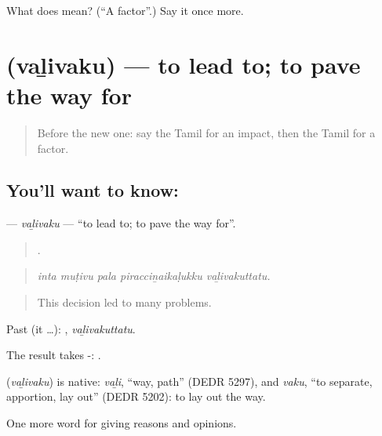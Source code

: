 \begin{tcolorbox}[breakable,colback=teal!4,colframe=teal!35!black,title={Before you move on}]
What does  mean? (\textquotedblleft{}A factor\textquotedblright{}.) Say it once more.
\end{tcolorbox}
\section[\texorpdfstring{\ta{வழிவகு} (vaḻivaku)}{வழிவகு (vaḻivaku)}]{ (vaḻivaku) — to lead to; to pave the way for}

\label{lesson:TA-C352-valivaku}



\begin{quote}
Before the new one: say the Tamil for an impact, then the Tamil for a factor.
\end{quote}

\subsection*{You'll want to know: }
\textbf{} — \emph{vaḻivaku} — \textquotedblleft{}to lead to; to pave the way for\textquotedblright{}.

\begin{quote}
    .
\end{quote}

\begin{quote}
\emph{inta muṭivu pala piracciṉaikaḷukku vaḻivakuttatu.}
\end{quote}

\begin{quote}
This decision led to many problems.
\end{quote}

Past (it …): , \emph{vaḻivakuttatu}.

The result takes -:  .

\begin{cousinweb}
\textbf{} (\emph{vaḻivaku}) is native: \emph{vaḻi}, \textquotedblleft{}way, path\textquotedblright{} (DEDR 5297), and \emph{vaku}, \textquotedblleft{}to separate, apportion, lay out\textquotedblright{} (DEDR 5202): to lay out the way.
\end{cousinweb}

\begin{grammarlens}[title={What you've built}]
One more word for giving reasons and opinions.
\end{grammarlens}

